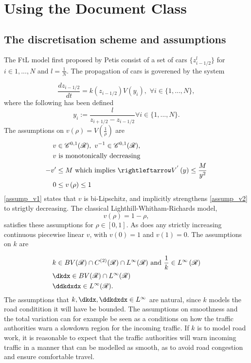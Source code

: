\chapter{Using the Document Class}
\label{chap:usage}


\section{The discretisation scheme and assumptions}
The FtL model first proposed by Petis consist of a set of cars $\{z^l_{i-1/2}\}$ for $i \in {1,...,N}$ and $l = \frac{1}{N}$. The propagation of cars is goverened by the system

\begin{equation} \label{FtL_model}
    \frac{d z_{i-1/2}}{dt} = k(z_{i-1/2}) V( y_i), \, \, \forall i \in \{1,...,N\}, 
\end{equation}
where the following has been defined 
\begin{equation}
    y_i := \frac{l}{z_{i+1/2} - z_{i-1/2}} \forall i \in \{1,...,N\}.  
\end{equation}
The assumptions on $v\left(\rho\right) = V\left(\frac{1}{\rho}\right)$ are 
\begin{align} 
    v &\in \C^{0,1}(\R), \, \, v^{-1} \in \C^{0,1}(\R), \label{assump_v1} \\
    v &\text{ is monotonically decreasing} \label{assump_v2}\\
    -v' &\leq M \text{ which implies }\rightleftarrow V^{'}\left(y\right) \leq \frac{M}{y^2} \label{assump_v3}\\
    0&\leq v\left(\rho\right) \leq 1
\end{align}
\eqref{assump_v1} states that $v$ is bi-Lipschitz, and implicitly strengthens \eqref{assump_v2} to strigtly decreasing. The classical Lighthill-Whitham-Richards model, 
\begin{equation}
    v(\rho) = 1 - \rho,
\end{equation}
satisfies these assumptions for $\rho \in [0,1]$. As does any strictly increasing continuous piecewise linear $v$, with $v(0) = 1$ and $v(1) = 0$. 
The assumptions on $k$ are 

\begin{align}
    &k \in BV(\R) \cap C^{(2)}(\R) \cap L^\infty(\R) \text{ and } \frac{1}{k} \in L^\infty\left(\R\right) \label{assump_k1}\\
    &\dkdx \in BV(\R)\cap L^\infty(\R) \label{assump_k2}\\
    &\ddkdxdx \in L^\infty(\R). \label{assump_k3}
\end{align}
The assumptions that $k, \dkdx, \ddkdxdx \in L^\infty$ are natural, since $k$ models the road conditition it will have be bounded. The assumptions on smoothness and the total variation can for example be seen as a conditions on how the traffic authorities warn a slowdown region for the incoming traffic. If $k$ is to model road work, it is reasonable to expect that the traffic authorities will warn incoming traffic in a manner that can be modelled as smooth, as to avoid road congestion and ensure comfortable travel. 

